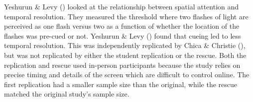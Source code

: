 \documentclass[
  english,
  a4paper,
]{article}
\begin{document}
Yeshurun \& Levy () looked at the relationship between spatial attention and temporal resolution.
They measured the threshold where two flashes of light are perceived as one flash versus two as a function of whether the location of the flashes was pre-cued or not.
Yeshurun \& Levy () found that cueing led to less temporal resolution.
This was independently replicated by Chica \& Christie (), but was not replicated by either the student replication or the rescue.
Both the replication and rescue used in-person participants because the study relies on precise timing and details of the screen which are difficult to control online.
The first replication had a smaller sample size than the original, while the rescue matched the original study's sample size.
\end{document}

